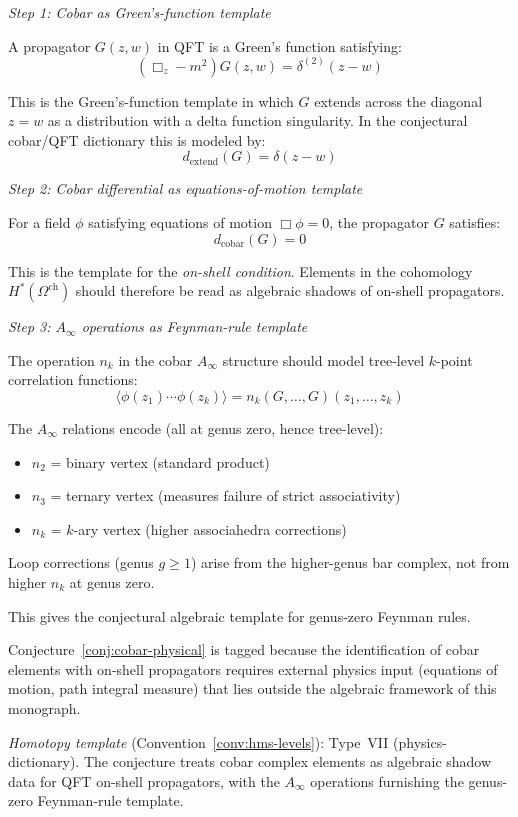 \begin{remark}
\emph{Step 1: Cobar as Green's-function template}

A propagator $G(z,w)$ in QFT is a Green's function satisfying:
\[(\Box_z - m^2) G(z,w) = \delta^{(2)}(z - w)\]

This is the Green's-function template in which $G$ extends across the diagonal
$z = w$ as a distribution with a delta function singularity. In the
conjectural cobar/QFT dictionary this is modeled by:
\[d_{\text{extend}}(G) = \delta(z - w)\]

\emph{Step 2: Cobar differential as equations-of-motion template}

For a field $\phi$ satisfying equations of motion $\Box \phi = 0$, the propagator 
$G$ satisfies:
\[d_{\text{cobar}}(G) = 0\]

This is the template for the \emph{on-shell condition}. Elements in the
cohomology $H^*(\Omega^{\text{ch}})$ should therefore be read as algebraic
shadows of on-shell propagators.

\emph{Step 3: $A_\infty$ operations as Feynman-rule template}

The operation $n_k$ in the cobar $A_\infty$ structure should model tree-level
$k$-point correlation
functions:
\[\langle \phi(z_1) \cdots \phi(z_k) \rangle = n_k(G, \ldots, G)(z_1, \ldots, z_k)\]

The $A_\infty$ relations encode (all at genus zero, hence tree-level):
\begin{itemize}
\item $n_2$ = binary vertex (standard product)
\item $n_3$ = ternary vertex (measures failure of strict associativity)
\item $n_k$ = $k$-ary vertex (higher associahedra corrections)
\end{itemize}
Loop corrections (genus $g \geq 1$) arise from the higher-genus bar complex, not from higher $n_k$ at genus zero.

This gives the conjectural algebraic template for genus-zero Feynman rules.
\end{remark}

\begin{remark}[Scope]
Conjecture~\ref{conj:cobar-physical} is tagged \ClaimStatusHeuristic{} because the identification of cobar elements with on-shell propagators requires external physics input (equations of motion, path integral measure) that lies outside the algebraic framework of this monograph.

\emph{Homotopy template} (Convention~\ref{conv:hms-levels}): Type~VII (physics-dictionary).
The conjecture treats cobar complex elements as algebraic shadow data for
QFT on-shell propagators, with the $A_\infty$ operations furnishing the
genus-zero Feynman-rule template.
\end{remark}

